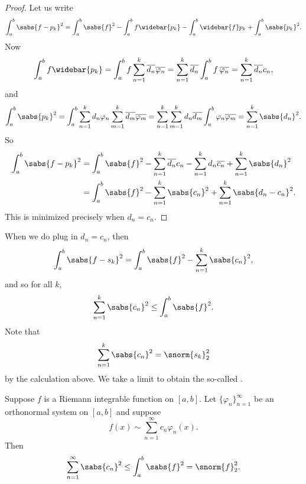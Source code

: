 \begin{proof}
Let us write
\begin{equation*}
\int_a^b \sabs{f-p_k}^2
=
\int_a^b \sabs{f}^2
-
\int_a^b f \widebar{p_k}
-
\int_a^b \widebar{f} p_k
+
\int_a^b \sabs{p_k}^2 .
\end{equation*}
Now
\begin{equation*}
\int_a^b f \widebar{p_k}
=
\int_a^b f \sum_{n=1}^k \overline{d_n} \overline{\varphi_n}
=
 \sum_{n=1}^k \overline{d_n} \int_a^b f \, \overline{\varphi_n}
=
 \sum_{n=1}^k \overline{d_n} c_n ,
\end{equation*}
and
\begin{equation*}
\int_a^b \sabs{p_k}^2
=
\int_a^b
\sum_{n=1}^k d_n \varphi_n
\sum_{m=1}^k \overline{d_m} \overline{\varphi_m}
=
\sum_{n=1}^k
\sum_{m=1}^k 
d_n
\overline{d_m} 
\int_a^b
\varphi_n
\overline{\varphi_m}
=
\sum_{n=1}^k
\sabs{d_n}^2 .
\end{equation*}
So
\begin{equation*}
\begin{split}
\int_a^b \sabs{f-p_k}^2
& =
\int_a^b \sabs{f}^2
-
\sum_{n=1}^k \overline{d_n} c_n
-
\sum_{n=1}^k d_n \overline{c_n}
+
\sum_{n=1}^k
\sabs{d_n}^2
\\
& =
\int_a^b \sabs{f}^2
-
\sum_{n=1}^k \sabs{c_n}^2
+
\sum_{n=1}^k
\sabs{d_n-c_n}^2 .
\end{split}
\end{equation*}
This is minimized precisely when $d_n = c_n$.
\end{proof}

When we do plug in $d_n = c_n$, then
\begin{equation*}
\int_a^b \sabs{f-s_k}^2
=
\int_a^b \sabs{f}^2
-
\sum_{n=1}^k \sabs{c_n}^2 ,
\end{equation*}
and so for all $k$,
\begin{equation*}
\sum_{n=1}^k \sabs{c_n}^2
\leq
\int_a^b \sabs{f}^2 .
\end{equation*}
Note that
\begin{equation*}
\sum_{n=1}^k \sabs{c_n}^2 = \snorm{s_k}_2^2
\end{equation*}
by the calculation above.
We take a limit to obtain the so-called
\emph{}.

\begin{thm} \label{thm:bessels}
Suppose $f$ is a Riemann integrable function on $[a,b]$.
Let $\{ \varphi_n \}_{n=1}^\infty$ be an orthonormal system on $[a,b]$ and
suppose
\begin{equation*}
f(x) \sim \sum_{n=1}^\infty c_n \varphi_n(x) .
\end{equation*}
Then
\begin{equation*}
\sum_{n=1}^\infty \sabs{c_n}^2
\leq
\int_a^b \sabs{f}^2
= \snorm{f}_2^2 .
\end{equation*}
\end{thm}

